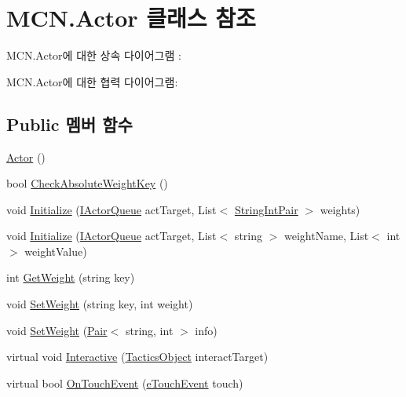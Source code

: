 \hypertarget{class_m_c_n_1_1_actor}{}\section{M\+C\+N.\+Actor 클래스 참조}
\label{class_m_c_n_1_1_actor}


M\+C\+N.\+Actor에 대한 상속 다이어그램 \+: 


M\+C\+N.\+Actor에 대한 협력 다이어그램\+:
\subsection*{Public 멤버 함수}
\begin{DoxyCompactItemize}
\item 
\hyperlink{class_m_c_n_1_1_actor_a6a3b8a1620a77b18521d714a7657ab75}{Actor} ()
\item 
bool \hyperlink{class_m_c_n_1_1_actor_a493bb0a37cb9fc5b1aa8507ec69b04ac}{Check\+Absolute\+Weight\+Key} ()
\item 
void \hyperlink{class_m_c_n_1_1_actor_a27b307fecbbbf3aa53f8b5683de7ff36}{Initialize} (\hyperlink{interface_m_c_n_1_1_i_actor_queue}{I\+Actor\+Queue} act\+Target, List$<$ \hyperlink{class_m_c_n_1_1_string_int_pair}{String\+Int\+Pair} $>$ weights)
\item 
void \hyperlink{class_m_c_n_1_1_actor_ae5856541ad65c2c0ecc055414d20df0f}{Initialize} (\hyperlink{interface_m_c_n_1_1_i_actor_queue}{I\+Actor\+Queue} act\+Target, List$<$ string $>$ weight\+Name, List$<$ int $>$ weight\+Value)
\item 
int \hyperlink{class_m_c_n_1_1_actor_af264703ef93c3c77b5b7062aef828205}{Get\+Weight} (string key)
\item 
void \hyperlink{class_m_c_n_1_1_actor_a8d8020782aefa7fff625f5f8e09f7539}{Set\+Weight} (string key, int weight)
\item 
void \hyperlink{class_m_c_n_1_1_actor_a4337ef4d88c2086f18db4f2e6415eddd}{Set\+Weight} (\hyperlink{class_m_c_n_1_1_pair}{Pair}$<$ string, int $>$ info)
\item 
virtual void \hyperlink{class_m_c_n_1_1_actor_a8ca8f46410f6ee9557e529e22fd6f6d1}{Interactive} (\hyperlink{class_tactics_object}{Tactics\+Object} interact\+Target)
\item 
virtual bool \hyperlink{class_m_c_n_1_1_actor_a4891cf321e2a9ee25fd618c19b785331}{On\+Touch\+Event} (\hyperlink{_touch_manager_8cs_ae33e321a424fe84ba8b2fdb81ad40a68}{e\+Touch\+Event} touch)
\end{DoxyCompactItemize}
